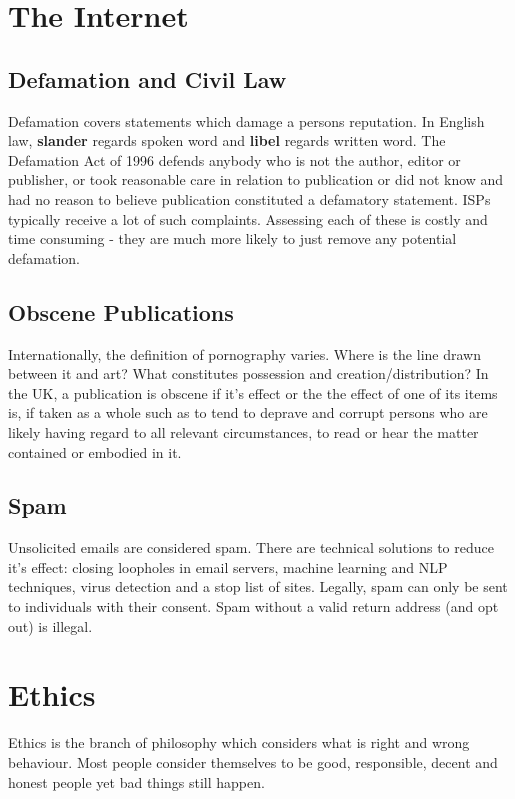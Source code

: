 \documentclass{article}
\begin{document}
	\section{The Internet}
	
	\subsection{Defamation and Civil Law}
	Defamation covers statements which damage a persons reputation. In English law, \textbf{slander} regards spoken word and \textbf{libel} regards written word. The Defamation Act of 1996 defends anybody who is not the author, editor or publisher, or took reasonable care in relation to publication or did not know and had no reason to believe publication constituted a defamatory statement. ISPs typically receive a lot of such complaints. Assessing each of these is costly and time consuming - they are much more likely to just remove any potential defamation.
	
	\subsection{Obscene Publications}
	Internationally, the definition of pornography varies. Where is the line drawn between it and art? What constitutes possession and creation/distribution? In the UK, a publication is obscene if it's effect or the the effect of one of its items is, if taken as a whole such as to tend to deprave and corrupt persons who are likely having regard to all relevant circumstances, to read or hear the matter contained or embodied in it.
	
	\subsection{Spam}
	Unsolicited emails are considered spam. There are technical solutions to reduce it's effect: closing loopholes in email servers, machine learning and NLP techniques, virus detection and a stop list of sites. Legally, spam can only be sent to individuals with their consent. Spam without a valid return address (and opt out) is illegal. 	
	
	\section{Ethics}
	Ethics is the branch of philosophy which considers what is right and wrong behaviour. Most people consider themselves to be good, responsible, decent and honest people yet bad things still happen.
	
\end{document}
